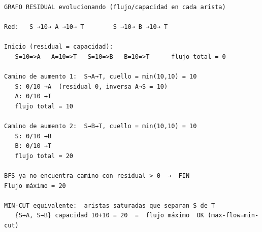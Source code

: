 \begin{dsacomofunciona}
\begin{verbatim}
GRAFO RESIDUAL evolucionando (flujo/capacidad en cada arista)

Red:   S →10→ A →10→ T        S →10→ B →10→ T

Inicio (residual = capacidad):
   S=10=>A   A=10=>T   S=10=>B   B=10=>T      flujo total = 0

Camino de aumento 1:  S→A→T, cuello = min(10,10) = 10
   S: 0/10 →A  (residual 0, inversa A→S = 10)
   A: 0/10 →T
   flujo total = 10

Camino de aumento 2:  S→B→T, cuello = min(10,10) = 10
   S: 0/10 →B
   B: 0/10 →T
   flujo total = 20

BFS ya no encuentra camino con residual > 0  →  FIN
Flujo máximo = 20

MIN-CUT equivalente:  aristas saturadas que separan S de T
   {S→A, S→B} capacidad 10+10 = 20  =  flujo máximo  OK (max-flow=min-cut)
\end{verbatim}
\end{dsacomofunciona}

